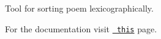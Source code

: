 Tool for sorting poem lexicographically.

For the documentation visit \href{https://rawgit.com/mary3000/cpp-hw-fall-2018/master/PoemSort/html/index.html}\texttt{ this} page. 